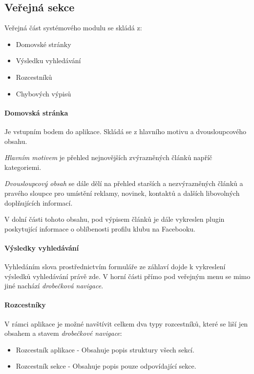 \documentclass[11pt,oneside]{fithesis}
\begin{document}
            \subsection*{Veřejná sekce}
            Veřejná část systémového modulu se skládá z:
            \begin{itemize}
                \item Domovské stránky
                \item Výsledku vyhledávání
                \item Rozcestníků
                \item Chybových výpisů
            \end{itemize}

            \paragraph*{Domovská stránka}
            Je vstupním bodem do aplikace. Skládá se z hlavního motivu a dvousloupcového obsahu. 

            \textit{Hlavním motivem} je přehled nejnovějších zvýrazněných článků napříč kategoriemi.

            \textit{Dvousloupcový obsah} se dále dělí na přehled starších a nezvýrazněných článků a pravého sloupce pro umístění reklamy, novinek, kontaktů a dalších libovolných doplňujících informací.

            V dolní části tohoto obsahu, pod výpisem článků je dále vykreslen plugin poskytující informace o oblíbenosti profilu klubu na Facebooku.

            \paragraph*{Výsledky vyhledávání}
            Vyhledáním slova prostřednictvím formuláře ze záhlaví dojde k vykreslení výsledků vyhledávání právě zde. V horní části přímo pod veřejným menu se mimo jiné nachází \textit{drobečková navigace}. 

            \paragraph*{Rozcestníky}
            V rámci aplikace je možné navštívit celkem dva typy rozcestníků, které se liší jen obsahem a stavem \textit{drobečkové navigace}:
            \begin{itemize}
                \item Rozcestník aplikace - Obsahuje popis struktury všech sekcí.
                \item Rozcestník sekce - Obsahuje popis pouze odpovídající sekce.
            \end{itemize}
\end{document}

